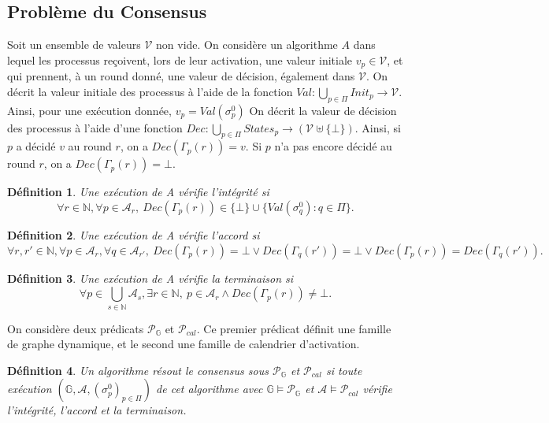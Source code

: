 \documentclass{article}
\newtheorem{definition}{Définition}
\begin{document}
\subsection{Probl\`eme du Consensus}

	Soit un ensemble de valeurs $\mathcal{V}$ non vide.
	On considère un algorithme $A$ dans lequel les processus reçoivent, lors de leur activation, une valeur initiale $v_p \in \mathcal{V}$,
	et qui prennent, à un round donné, une valeur de décision, également dans $\mathcal{V}$.
	On décrit la valeur initiale des processus à l'aide de la fonction $Val : \bigcup\limits_{p \in \Pi} Init_p  \rightarrow \mathcal{V}$.
	Ainsi, pour une exécution donnée, $v_p = Val(\sigma_p^0)$
	On décrit la valeur de décision des processus à l'aide d'une fonction
	$Dec : \bigcup\limits_{p \in \Pi} States_p  \rightarrow (\mathcal{V} \uplus \{\bot\})$.
	Ainsi, si $p$ a décidé $v$ au round $r$, on a $Dec(\Gamma_p(r)) = v$. Si $p$ n'a pas encore décidé au round $r$, on a $Dec(\Gamma_p(r)) = \bot$.

\begin{definition}
	Une exécution de A \emph{vérifie  l'intégrité} si 
	$$ \forall r \in \mathds{N},\forall p \in \mathcal{A}_{r}, \ Dec(\Gamma_p(r)) \in \{ \bot \} \cup  \{ Val(\sigma^0_q) :  q \in \Pi \}  .$$
\end{definition}

\begin{definition}
	Une exécution de A  \emph{vérifie l'accord} si
	$$\forall r, r'  \in \mathds{N}, \forall p \in \mathcal{A}_{r}, \forall q \in \mathcal{A}_{r'}, 
		\ Dec(\Gamma_p(r)) = \bot \vee Dec(\Gamma_q(r')) = \bot \vee Dec(\Gamma_p(r)) = Dec(\Gamma_q(r')) .$$
\end{definition}

\begin{definition}
	Une exécution de A \emph{vérifie la terminaison} si
	$$ \forall p \in \bigcup\limits_{s \in \mathds{N}} \mathcal{A}_s, \exists r \in \mathds{N}, \ 
		p \in \mathcal{A}_r \wedge Dec(\Gamma_p(r)) \neq \bot .  $$
\end{definition}

On considère deux prédicats $\mathcal{P}_{\mathds{G}}$ et $\mathcal{P}_{cal}$.
Ce premier prédicat définit une famille de graphe dynamique, et le second une famille de calendrier d'activation.
	
\begin{definition}\label{def:resforte}
	Un algorithme \emph{résout le consensus sous $\mathcal{P}_{\mathds{G}}$ et $\mathcal{P}_{cal}$} si toute exécution 
	$( \mathds{G} ,  \mathcal{A} , (\sigma^0_p)_{p \in \Pi})$    de cet algorithme
	avec $ \mathds{G} \models \mathcal{P}_{\mathds{G}}$ et $\mathcal{A}	\models \mathcal{P}_{cal}$  vérifie l'intégrité, l'accord et la terminaison.
\end{definition}
\end{document}

